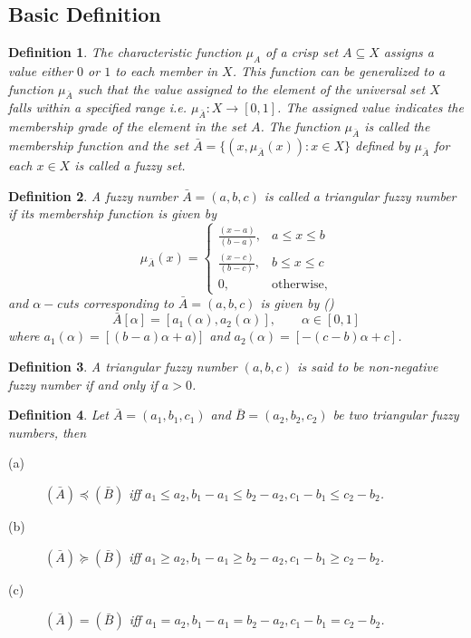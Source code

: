 \documentclass{iaesarticle3}
\newtheorem{definition}{Definition}
\begin{document}
\subsection{Basic Definition}
\begin{definition}
    \emph{\cite{kau}} The characteristic function $\mu_{A}$ of a crisp set $A \subseteq X$ assigns a value either $0$ or $1$ to each member in $X$. This function can be generalized to a function $\mu_{\bar{A}}$ such that the value assigned to the element of the universal set $X$ falls within a specified range i.e. $\mu_{\bar{A}}\colon X \to [0,1]$. The assigned value indicates the membership grade of the element in the set $A$. The function $\mu_{\bar{A}}$ is called the membership function and the set $\bar{A} = \{(x, \mu_{\bar{A}}(x))\colon x \in X \}$ defined by $\mu_{\bar{A}}$ for each $x \in X$ is called a fuzzy set.
\end{definition}
\begin{definition}
    \emph{\cite{lio}} A fuzzy number $\bar{A} = (a,b,c)$ is called a triangular fuzzy number if its membership function is given by
    \begin{displaymath}
        \mu_{\bar{A}}(x) =
        \left \{ \begin{array}{ll}
            \frac{(x-a)}{(b-a)},& a\leq x\leq b \\
            \frac{(x-c)}{(b-c)}, & b\leq x \leq c\\
            0, & \textrm{otherwise},
        \end{array} \right.
    \end{displaymath}
    and $\alpha-$cuts corresponding to $\bar{A} = (a, b, c)$ is given by \emph{(\cite{jam})}
    \begin{displaymath}
        \bar{A}[\alpha] = [a_1(\alpha), a_2(\alpha)], \qquad \alpha \in [0,1]
    \end{displaymath} where $a_1(\alpha) = [(b-a)\alpha +a)]$ and $a_2(\alpha) = [-(c-b)\alpha+ c]$.
\end{definition}

\begin{definition}
    \emph{\cite{lio}} A triangular fuzzy number $(a, b, c)$ is said to be non-negative fuzzy number if and only if $a > 0$.
\end{definition}

\begin{definition}
    Let $\bar{A} = (a_1, b_1, c_1)$ and $\bar{B} = (a_2, b_2, c_2)$ be two triangular fuzzy numbers, then
    \begin{description}
        \item[(a)] $(\bar{A}) \preceq (\bar{B})$ iff $a_1 \leq a_2, b_1 - a_1 \leq b_2 - a_2, c_1 - b_1 \leq c_2 - b_2$.
        \item[(b)] $(\bar{A}) \succeq (\bar{B})$ iff $a_1 \geq a_2, b_1 - a_1 \geq b_2 - a_2, c_1 - b_1 \geq c_2 - b_2$.
        \item[(c)] $(\bar{A}) = (\bar{B})$ iff $a_1 = a_2, b_1 - a_1 = b_2 - a_2, c_1 - b_1 = c_2 - b_2$.
    \end{description}
\end{definition}
\end{document}
